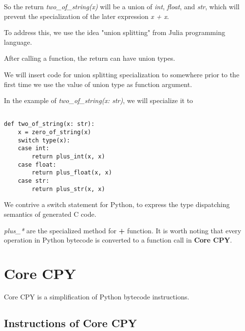 \documentclass[12pt, a4paper]{report}
\begin{document}
So the return \textit{two\_of\_string(x)} will be a union of \textit{int}, \textit{float}, and \textit{str},
which will prevent the specialization of the later expression \textit{x + x}.

To address this, we use the idea "union splitting" from Julia programming language. %

After calling a function, the return can have union types.

We will insert code for union splitting specialization to somewhere prior to the first time we use the value of union type as function argument.

In the example of \textit{two\_of\_string(x: str)}, we will specialize it to

\begin{lstlisting}

def two_of_string(x: str):
    x = zero_of_string(x)
    switch type(x):
    case int:
        return plus_int(x, x)
    case float:
        return plus_float(x, x)
    case str:
        return plus_str(x, x)

\end{lstlisting}

We contrive a switch statement for Python, to express the type dispatching semantics of generated C code.

\textit{plus\_*} are the specialized method for \textbf{+} function. It is worth noting that every operation in Python bytecode is converted to
a function call in \textbf{Core CPY}.


\section*{Core CPY}

Core CPY is a simplification of Python bytecode instructions.

\subsection*{Instructions of Core CPY}

\begin{bnf*}
    \\
    \\
    \\
    \\
    \\
    \\
     \\
     \\
     \\
\end{bnf*}
\end{document}
